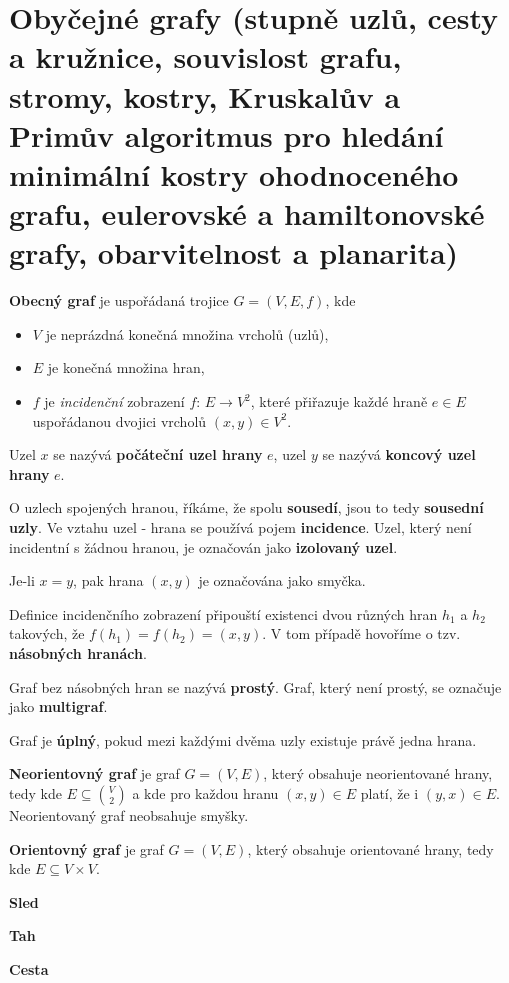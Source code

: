 \documentclass[11pt,a4paper]{article}
\begin{document}
\section{Obyčejné grafy (stupně uzlů, cesty a kružnice, souvislost grafu, stromy, kostry, Kruskalův a Primův algoritmus pro hledání minimální kostry ohodnoceného grafu, eulerovské a hamiltonovské grafy, obarvitelnost a planarita)}

\textbf{Obecný graf} je uspořádaná trojice $G = (V, E, f)$, kde
\begin{itemize}
\item $V$ je neprázdná konečná množina vrcholů (uzlů),
\item $E$ je konečná množina hran,
\item $f$ je \textit{incidenční} zobrazení $f$: $E \rightarrow V^2$, které přiřazuje každé hraně $e \in E$ uspořádanou dvojici vrcholů $(x,y) \in V^2$.
\end{itemize}

Uzel $x$ se nazývá \textbf{počáteční uzel hrany} $e$, uzel $y$ se nazývá \textbf{koncový uzel hrany} $e$.

O uzlech spojených hranou, říkáme, že spolu \textbf{sousedí}, jsou to tedy \textbf{sousední uzly}. Ve vztahu uzel - hrana se používá pojem \textbf{incidence}. Uzel, který není incidentní s žádnou hranou, je označován jako \textbf{izolovaný uzel}.

Je-li $x = y$, pak hrana $(x, y)$ je označována jako smyčka.

Definice incidenčního zobrazení připouští existenci dvou různých hran $h_1$ a $h_2$ takových, že $f(h_1) = f(h_2) = (x,y)$. V tom případě hovoříme o tzv. \textbf{násobných hranách}.

Graf bez násobných hran se nazývá \textbf{prostý}. Graf, který není prostý, se označuje jako \textbf{multigraf}. 

Graf je \textbf{úplný}, pokud mezi každými dvěma uzly existuje právě jedna hrana.

\textbf{Neorientovný graf} je graf $G = (V, E)$, který obsahuje neorientované hrany, tedy kde $E \subseteq {V \choose 2}$ a kde pro každou hranu $(x, y) \in E$ platí, že i $(y, x) \in E$. Neorientovaný graf neobsahuje smyšky.

\textbf{Orientovný graf} je graf $G = (V, E)$, který obsahuje orientované hrany, tedy kde $E \subseteq V \times V$.

\textbf{Sled}

\textbf{Tah}

\textbf{Cesta}
\end{document}
